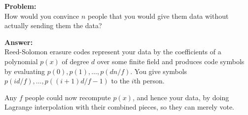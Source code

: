 \documentclass{beamer}
\begin{document}
\begin{frame}

{\bf Problem:}  \\
How would you convince $n$ people that you would give them data without actually sending them the data?

\bigskip

{\bf Answer:}  \\
Reed-Solomon erasure codes represent your data by the coefficients of a polynomial $p(x)$ of degree $d$ over some finite field and produces code symbols by evaluating $p(0),p(1),\ldots,p(d n / f)$.  You give symbols $p(i d/f),\ldots,p((i+1) d/f - 1)$ to the $i$th person. 

Any $f$ people could now recompute $p(x)$, and hence your data, by doing Lagrange interpolation with their combined pieces, so they can merely vote.

\end{frame}


%
%
\end{document}
